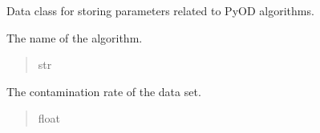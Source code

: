 \documentclass[letterpaper,10pt,english]{sphinxmanual}
\begin{document}
\begin{fulllineitems}
\label{\detokenize{modules:application.services.PyodWrapper.PyodParameters}}
\pysigstartsignatures
{}
\pysigstopsignatures
\sphinxAtStartPar
Data class for storing parameters related to PyOD algorithms.

\begin{fulllineitems}
\label{\detokenize{modules:application.services.PyodWrapper.PyodParameters.algorithm_name}}
\pysigstartsignatures
{}
\pysigstopsignatures
\sphinxAtStartPar
The name of the algorithm.
\begin{quote}\begin{description}
\sphinxAtStartPar
str

\end{description}\end{quote}

\end{fulllineitems}


\begin{fulllineitems}
\label{\detokenize{modules:application.services.PyodWrapper.PyodParameters.contamination}}
\pysigstartsignatures
{}
\pysigstopsignatures
\sphinxAtStartPar
The contamination rate of the data set.
\begin{quote}\begin{description}
\sphinxAtStartPar
float

\end{description}\end{quote}

\end{fulllineitems}


\end{fulllineitems}
\end{document}
